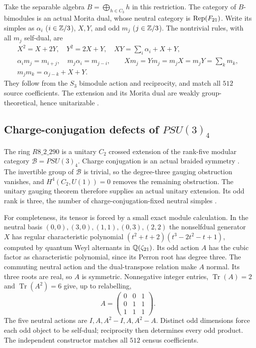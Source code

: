 Take the separable algebra $B=\bigoplus_{h\in C_3}h$ in this
restriction. The category of $B$-bimodules is an actual Morita dual,
whose neutral category is $\operatorname{Rep}(F_{21})$. Write its simples as
$\alpha_i$ ($i\in\mathbb Z/3$), $X,Y$, and odd $m_j$ ($j\in\mathbb Z/3$).
The nontrivial rules, with all $m_j$ self-dual, are
\[
\begin{gathered}
X^2=X+2Y,\quad Y^2=2X+Y,\quad
XY=\sum_i\alpha_i+X+Y,\\
\alpha_i m_j=m_{i+j},\quad m_j\alpha_i=m_{j-i},\qquad
X m_j=Y m_j=m_jX=m_jY=\sum_km_k,\\
m_jm_k=\alpha_{j-k}+X+Y.
\end{gathered}
\]
They follow from the $S_3$ bimodule action and reciprocity, and match
all $512$ source coefficients. The extension and its Morita dual are
weakly group-theoretical, hence unitarizable
\cite[Theorem~5.20]{GHR}.

\subsection{Charge-conjugation defects of \texorpdfstring{$PSU(3)_4$}{PSU(3)4}}
The ring $R8\_2\_290$ is a unitary $C_2$ crossed extension of the
rank-five modular category $\mathcal B=PSU(3)_4$. Charge conjugation
is an actual braided symmetry
\cite[Corollary~2.7]{EdieSU3}. The invertible group of $\mathcal B$
is trivial, so the degree-three gauging obstruction vanishes, and
$H^4(C_2,U(1))=0$ removes the remaining obstruction. The unitary
gauging theorem \cite[Sections~3.2--3.4]{Gauging} therefore supplies
an actual unitary extension. Its odd rank is three, the number of
charge-conjugation-fixed neutral simples \cite[Proposition~1.1]{Bischoff}.

For completeness, its tensor is forced by a small exact module
calculation. In the neutral basis
$(0,0),(3,0),(1,1),(0,3),(2,2)$ the nonselfdual generator $X$ has
regular characteristic polynomial
$(t^2+t+2)(t^3-2t^2-t+1)$, computed by quantum Weyl alternants in
$\mathbb Q(\zeta_{21})$. Its odd action $A$ has the cubic factor as
characteristic polynomial, since its Perron root has degree three.
The commuting neutral action and the dual-transpose relation make
$A$ normal. Its three roots are real, so $A$ is symmetric.
Nonnegative integer entries, $\operatorname{Tr}(A)=2$ and
$\operatorname{Tr}(A^2)=6$ give, up to relabelling,
\[
A=\begin{pmatrix}0&0&1\\0&1&1\\1&1&1\end{pmatrix}.
\]
The five neutral actions are
$I,A,A^2-I,A,A^2-A$. Distinct odd dimensions force each odd object
to be self-dual; reciprocity then determines every odd product.
The independent constructor matches all $512$ census coefficients.

